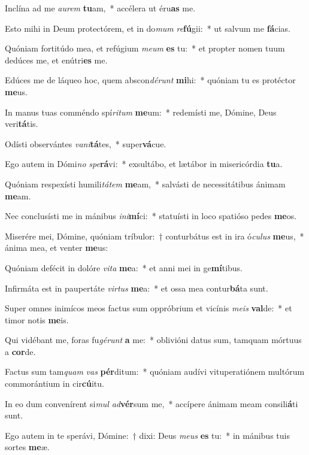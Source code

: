 \item Inclína ad me \textit{au}\textit{rem} \textbf{tu}am,~* accélera ut éru\textbf{as} me.
\item Esto mihi in Deum protectórem, et in do\textit{mum} \textit{re}\textbf{fú}gii:~* ut salvum me \textbf{fá}cias.
\item Quóniam fortitúdo mea, et refúgium \textit{me}\textit{um} \textbf{es} tu:~* et propter nomen tuum dedúces me, et enútri\textbf{es} me.
\item Edúces me de láqueo hoc, quem abscon\textit{dé}\textit{runt} \textbf{mi}hi:~* quóniam tu es protéctor \textbf{me}us.
\item In manus tuas comméndo spí\textit{ri}\textit{tum} \textbf{me}um:~* redemísti me, Dómine, Deus veri\textbf{tá}tis.
\item Odísti observántes \textit{va}\textit{ni}\textbf{tá}tes,~* super\textbf{vá}cue.
\item Ego autem in Dómi\textit{no} \textit{spe}\textbf{rá}vi:~* exsultábo, et lætábor in misericórdia \textbf{tu}a.
\item Quóniam respexísti humili\textit{tá}\textit{tem} \textbf{me}am,~* salvásti de necessitátibus ánimam \textbf{me}am.
\item Nec conclusísti me in mánibus \textit{in}\textit{i}\textbf{mí}ci:~* statuísti in loco spatióso pedes \textbf{me}os.
\item Miserére mei, Dómine, quóniam tríbulor:~† conturbátus est in ira ó\textit{cu}\textit{lus} \textbf{me}us,~* ánima mea, et venter \textbf{me}us:
\item Quóniam defécit in dolóre \textit{vi}\textit{ta} \textbf{me}a:~* et anni mei in ge\textbf{mí}tibus.
\item Infirmáta est in paupertáte \textit{vir}\textit{tus} \textbf{me}a:~* et ossa mea contur\textbf{bá}ta sunt.
\item Super omnes inimícos meos factus sum oppróbrium et vicínis \textit{me}\textit{is} \textbf{val}de:~* et timor notis \textbf{me}is.
\item Qui vidébant me, foras fu\textit{gé}\textit{runt} \textbf{a} me:~* oblivióni datus sum, tamquam mórtuus a \textbf{cor}de.
\item Factus sum tam\textit{quam} \textit{vas} \textbf{pér}ditum:~* quóniam audívi vituperatiónem multórum commorántium in cir\textbf{cú}itu.
\item In eo dum convenírent si\textit{mul} \textit{ad}\textbf{vér}sum me,~* accípere ánimam meam consili\textbf{á}ti sunt.
\item Ego autem in te sperávi, Dómine:~† dixi: Deus \textit{me}\textit{us} \textbf{es} tu:~* in mánibus tuis sortes \textbf{me}æ.
